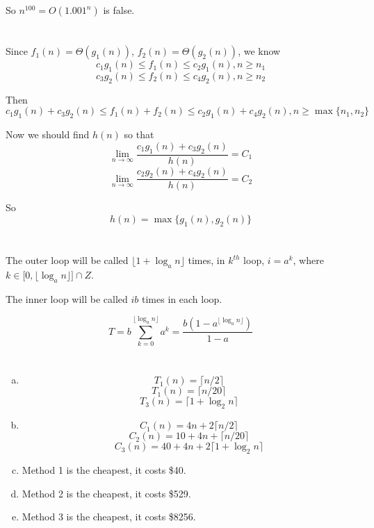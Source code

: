 \documentclass{article}
\begin{document}
So $n^{100}=O(1.001^n)$ is false.

\section{}
Since $f_1(n)=\Theta(g_1(n))$, $f_2(n)=\Theta(g_2(n))$, we know
$$c_1g_1(n)\leqslant f_1(n)\leqslant c_2g_1(n),n\geqslant n_1$$
$$c_3g_2(n)\leqslant f_2(n)\leqslant c_4g_2(n),n\geqslant n_2$$

Then
$$c_1g_1(n)+c_3g_2(n)\leqslant f_1(n)+f_2(n)\leqslant c_2g_1(n)+c_4g_2(n),n\geqslant \max\{n_1,n_2\}$$

Now we should find $h(n)$ so that
$$\lim_{n\to\infty}\frac{c_1g_1(n)+c_3g_2(n)}{h(n)}=C_1$$
$$\lim_{n\to\infty}\frac{c_2g_2(n)+c_4g_2(n)}{h(n)}=C_2$$

So $$h(n)=\max\{g_1(n),g_2(n)\}$$

\section{}
The outer loop will be called $\lfloor1+\log_an\rfloor$ times, in $k^{th}$ loop, $i=a^k$, where $k\in\Big[0,\lfloor\log_an\rfloor\Big]\cap Z$.

The inner loop will be called $ib$ times in each loop.

$$T=b\sum_{k=0}^{\lfloor\log_an\rfloor}a^k=\frac{b\left(1-a^{\lfloor\log_an\rfloor}\right)}{1-a}$$

\section{}
\begin{enumerate}[(a)]
\item
$$T_1(n)=\lceil n/2\rceil$$
$$T_1(n)=\lceil n/20\rceil$$
$$T_3(n)=\lceil 1+\log_2n\rceil$$
\item
$$C_1(n)=4n+2\lceil n/2\rceil$$
$$C_2(n)=10+4n+\lceil n/20\rceil$$
$$C_3(n)=40+4n+2\lceil 1+\log_2n\rceil$$
\item
Method 1 is the cheapest, it costs \$40.
\item
Method 2 is the cheapest, it costs \$529.
\item
Method 3 is the cheapest, it costs \$8256.
\end{enumerate}
\end{document}
